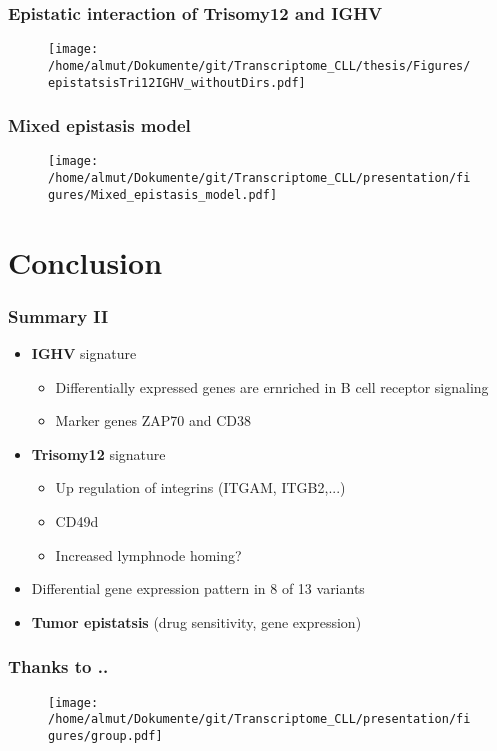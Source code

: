 \documentclass[xcolor=dvipsnames,t,10pt]{beamer}
\begin{document}
%
%
\begin{frame}[c]
	\frametitle{Epistatic interaction of Trisomy12 and IGHV}
	\begin{figure}
		\centering
		\texttt{[image: /home/almut/Dokumente/git/Transcriptome\_CLL/thesis/Figures/epistatsisTri12IGHV\_withoutDirs.pdf]}
	\end{figure}
\end{frame}
%
%
\begin{frame}[c]
	\frametitle{Mixed epistasis model}
	\begin{figure}
		\centering
		\texttt{[image: /home/almut/Dokumente/git/Transcriptome\_CLL/presentation/figures/Mixed\_epistasis\_model.pdf]}
	\end{figure}
\end{frame}
%
%
\section{Conclusion}
%
%
\begin{frame}[c]
	\frametitle{Summary II}
	\begin{itemize}
		\item \textbf{IGHV} signature
		\begin{itemize}
			\item Differentially expressed genes are ernriched in B cell receptor signaling
			\item Marker genes ZAP70 and CD38 
		\end{itemize}
		\item \textbf{Trisomy12} signature
		\begin{itemize}
			\item Up regulation of integrins (ITGAM, ITGB2,...)
			\item CD49d
			\item Increased lymphnode homing?
		\end{itemize} 
		\item Differential gene expression pattern in 8 of 13 variants
		\item \textbf{Tumor epistatsis} (drug sensitivity, gene expression)
	\end{itemize}
\end{frame}
% 
% 
%
\begin{frame}[c]
	\frametitle{Thanks to ..}
	\begin{figure}
		\centering
		\texttt{[image: /home/almut/Dokumente/git/Transcriptome\_CLL/presentation/figures/group.pdf]}
	\end{figure}
\end{frame}
% 
% 
% 
\appendix
\end{document}
